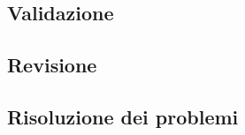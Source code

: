 \documentclass[../norme-di-progetto.tex]{subfiles}
\begin{document}


\subsection{Validazione}%
\label{sub:validazione}



\subsection{Revisione}%
\label{sub:revisione}



\subsection{Risoluzione dei problemi}%
\label{sub:risoluzione_dei_problemi}


\end{document}
